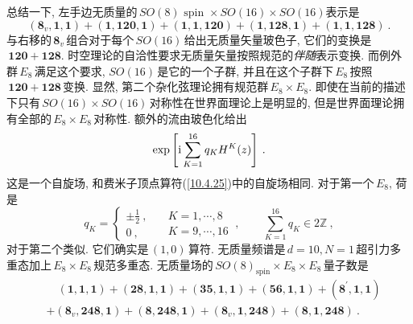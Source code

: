 总结一下, 左手边无质量的$\,SO(8)\text{ spin }\times SO(16)\times SO(16)$表示是
\begin{equation}
    (\mathbf{8}_{v},\mathbf{1},\mathbf{1})+(\mathbf{1},\mathbf{120},\mathbf{1})
    +(\mathbf{1},\mathbf{1},\mathbf{120})+(\mathbf{1},\mathbf{128},\mathbf{1})
    +(\mathbf{1},\mathbf{1},\mathbf{128}) \:. \label{11.2.25}
\end{equation}
与右移的$\,\mathbf{8}_{v}\,$组合对于每个\,$SO(16)$\,给出无质量矢量玻色子, 它们的变换是$\,\mathbf{120}+\mathbf{128}$. 时空理论的自洽性要求无质量矢量按照规范的{\emph{伴随}}表示变换. 而例外群$\,E_{8}\,$满足这个要求, $SO(16)\,$是它的一个子群, 并且在这个子群下$\,E_{8}\,$按照$\,\mathbf{120}+\mathbf{128}\,$变换. 显然, 第二个杂化弦理论拥有规范群$\,E_{8}\times E_{8}$. 即使在当前的描述下只有$\,SO(16)\times SO(16)\,$对称性在世界面理论上是明显的, 但是世界面理论拥有全部的$\,E_{8}\times E_{8}\,$对称性. 额外的流由玻色化给出
\begin{equation}
    \exp \left[ \mathrm{i}\sum_{K=1}^{16}q_{K}H^{K}(z) \right] \:. \label{11.2.26}
\end{equation}
这是一个自旋场, 和费米子顶点算符(\ref{10.4.25})中的自旋场相同. 对于第一个$\,E_{8}$, 荷是
\begin{equation}
    q_{K} = \left\{
    \begin{array}{l}
         \pm\tfrac{1}{2} \:,  \\
         0  \:,
    \end{array} \quad
    \begin{array}{l}
         K=1,\cdots,8  \\
         K=9,\cdots, 16 
    \end{array} \:,
    \qquad 
    \sum_{K=1}^{16} q_{K}\in 2\mathds{Z} \:, \label{11.2.27}
    \right.
\end{equation}
对于第二个类似. 它们确实是$\,(1,0)\,$算符. 无质量频谱是$\,d=10,N=1\,$超引力多重态加上$\,E_{8}\times E_{8}\,$规范多重态. 无质量场的$\,SO(8)_{\text{spin}}\times E_{8}\times E_{8}\,$量子数是
\begin{align}
    &\quad (\mathbf{1},\mathbf{1},\mathbf{1})+(\mathbf{28},\mathbf{1},\mathbf{1})+(\mathbf{35},\mathbf{1},\mathbf{1})
    +(\mathbf{56},\mathbf{1},\mathbf{1})+(\mathbf{8}^{\prime},\mathbf{1},\mathbf{1})  \nonumber \\
    &+(\mathbf{8}_{v},\mathbf{248},\mathbf{1})+(\mathbf{8},\mathbf{248},\mathbf{1})
    +(\mathbf{8}_{v},\mathbf{1},\mathbf{248})+(\mathbf{8},\mathbf{1},\mathbf{248}) \:. \label{11.2.28}
\end{align}

